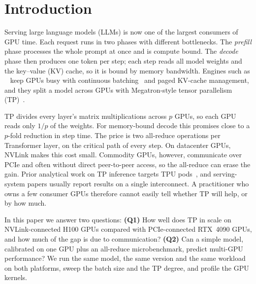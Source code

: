 \section{Introduction}
\label{sec:intro}

Serving large language models (LLMs) is now one of the largest consumers of GPU time.
Each request runs in two phases with different bottlenecks.
The \emph{prefill} phase processes the whole prompt at once and is compute bound.
The \emph{decode} phase then produces one token per step; each step reads all model
weights and the key--value (KV) cache, so it is bound by memory bandwidth.
Engines such as \vllm~\cite{kwon2023pagedattention} keep GPUs busy with continuous
batching~\cite{yu2022orca} and paged KV-cache management, and they split a model across
GPUs with Megatron-style tensor parallelism (TP)~\cite{shoeybi2019megatron}.

TP divides every layer's matrix multiplications across $p$ GPUs, so each GPU reads only
$1/p$ of the weights.
For memory-bound decode this promises close to a $p$-fold reduction in step time.
The price is two all-reduce operations per Transformer layer, on the critical path of
every step.
On datacenter GPUs, NVLink makes this cost small.
Commodity GPUs, however, communicate over PCIe and often without direct peer-to-peer
access, so the all-reduce can erase the gain.
Prior analytical work on TP inference targets TPU pods~\cite{pope2023efficiently}, and
serving-system papers usually report results on a single interconnect.
A practitioner who owns a few consumer GPUs therefore cannot easily tell whether TP will
help, or by how much.

In this paper we answer two questions:
\textbf{(Q1)} How well does TP in \vllm scale on NVLink-connected H100 GPUs compared with
PCIe-connected RTX~4090 GPUs, and how much of the gap is due to communication?
\textbf{(Q2)} Can a simple model, calibrated on one GPU plus an all-reduce
microbenchmark, predict multi-GPU performance?
We run the same model, the same \vllm version and the same workload on both platforms,
sweep the batch size and the TP degree, and profile the GPU kernels.

